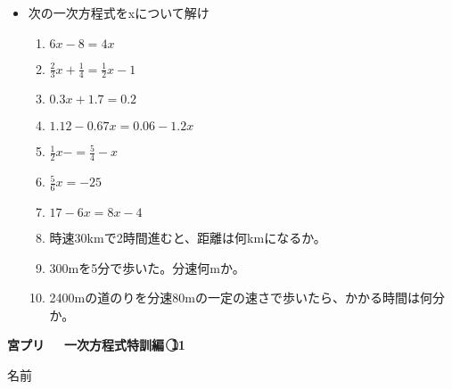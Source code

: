 \documentclass[a4paper,fleqn,papersize,15pt]{jsarticle}
\begin{document}
 \begin{itemize}
   \item 次の一次方程式をxについて解け
   \begin{enumerate}
\item $6x-8=4x$ \begin{flushright}\framebox[8em]{\rule{0pt}{6ex}}\end{flushright} %
\item $\frac{2}{3} x+ \frac{1}{4} = \frac{1}{2}x-1$ \begin{flushright}\framebox[8em]{\rule{0pt}{6ex}}\end{flushright} %
\item $0.3x+1.7=0.2$ \begin{flushright}\framebox[8em]{\rule{0pt}{6ex}}\end{flushright} %
\item $1.12-0.67x=0.06-1.2x$ \begin{flushright}\framebox[8em]{\rule{0pt}{6ex}}\end{flushright} %
\item $\frac{1}{2} x-  = \frac{5}{4} -x$ \begin{flushright}\framebox[8em]{\rule{0pt}{6ex}}\end{flushright} %
\item $\frac{5}{6} x=-25$ \begin{flushright}\framebox[8em]{\rule{0pt}{6ex}}\end{flushright} %
\item $17-6x=8x-4$ \begin{flushright}\framebox[8em]{\rule{0pt}{6ex}}\end{flushright} %
\item 時速30kmで2時間進むと、距離は何kmになるか。 \vfill \begin{flushright}\framebox[8em]{\rule{0pt}{6ex}}\end{flushright} %
\item 300mを5分で歩いた。分速何mか。 \vfill \begin{flushright}\framebox[8em]{\rule{0pt}{6ex}}\end{flushright} %
\item 2400mの道のりを分速80mの一定の速さで歩いたら、かかる時間は何分か。 \vfill \begin{flushright}\framebox[8em]{\rule{0pt}{6ex}}\end{flushright} %
\end{enumerate}
    \vfill
\end{itemize}
\clearpage
 \begin{center}
   \LARGE\textbf{宮プリ　~一次方程式特訓編~\textcircled{\scriptsize 11}}
     \begin{flushright}
       名前\underline{\hspace{8zw}}
     \end{flushright}
 \end{center}
\end{document}
